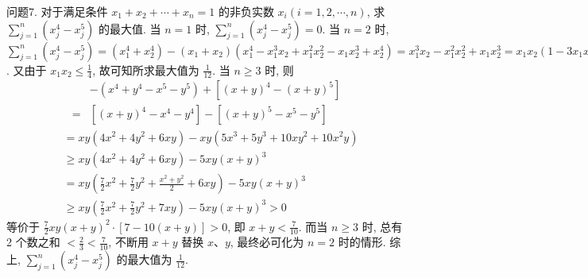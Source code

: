 问题7. 对于满足条件 $x_1+x_2+\cdots+x_n=1$ 的非负实数 $x_i(i=1,2, \cdots, n)$, 求 $\sum_{j=1}^n\left(x_j^4-x_j^5\right)$ 的最大值.
当 $n=1$ 时, $\sum_{j=1}^n\left(x_j^4-x_j^5\right)=0$.
当 $n=2$ 时, $\sum_{j=1}^n\left(x_j^4-x_j^5\right)=\left(x_1^4+x_2^4\right)-\left(x_1+x_2\right)\left(x_1^4-x_1^3 x_2+x_1^2 x_2^2-\right. \left.x_1 x_2^3+x_2^4\right)=x_1^3 x_2-x_1^2 x_2^2+x_1 x_2^3=x_1 x_2\left(1-3 x_1 x_2\right)$.
又由于 $x_1 x_2 \leqslant \frac{1}{4}$, 故可知所求最大值为 $\frac{1}{12}$.
当 $n \geqslant 3$ 时, 则
$$
\begin{aligned}
& -\left(x^4+y^4-x^5-y^5\right)+\left[(x+y)^4-(x+y)^5\right] \\
= & {\left[(x+y)^4-x^4-y^4\right]-\left[(x+y)^5-x^5-y^5\right] }
\end{aligned}
$$
$$
\begin{aligned}
& =x y\left(4 x^2+4 y^2+6 x y\right)-x y\left(5 x^3+5 y^3+10 x y^2+10 x^2 y\right) \\
& \geqslant x y\left(4 x^2+4 y^2+6 x y\right)-5 x y(x+y)^3 \\
& =x y\left(\frac{7}{2} x^2+\frac{7}{2} y^2+\frac{x^2+y^2}{2}+6 x y\right)-5 x y(x+y)^3 \\
& \geqslant x y\left(\frac{7}{2} x^2+\frac{7}{2} y^2+7 x y\right)-5 x y(x+y)^3>0
\end{aligned}
$$
等价于 $\frac{7}{2} x y(x+y)^2 \cdot[7-10(x+y)]>0$, 即 $x+y<\frac{7}{10}$.
而当 $n \geqslant 3$ 时, 总有 2 个数之和 $<\frac{2}{3}<\frac{7}{10}$, 不断用 $x+y$ 替换 $x 、 y$, 最终必可化为 $n=2$ 时的情形.
综上, $\sum_{j=1}^n\left(x_j^4-x_j^5\right)$ 的最大值为 $\frac{1}{12}$.



